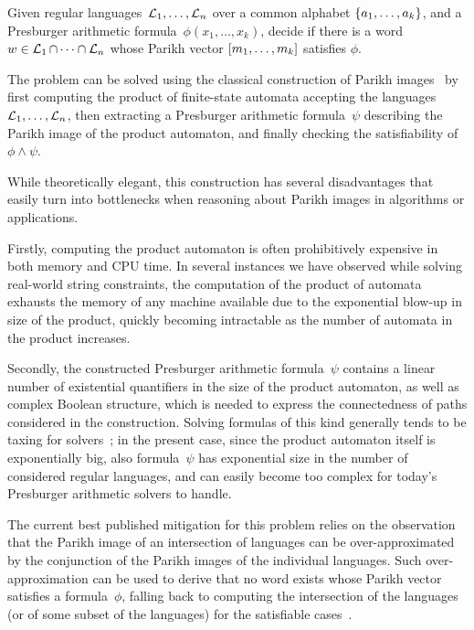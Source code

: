 {
    \centering
    \begin{tcolorbox}[colback=gray!5!white,colframe=gray!75!black,%
        title=Joint satisfiability of Parikh images modulo Presburger arithmetic constraints,%
        width=0.9\linewidth]
        Given regular languages~$\operatorname{\mathcal{L}}_1, \ldots, \operatorname{\mathcal{L}}_n$
        over a common alphabet $\left\{a_1, \ldots, a_k\right\}$,
        and a Presburger arithmetic formula~$\phi(x_1, \ldots, x_k)$, 
        decide if there is a word~$w \in \operatorname{\mathcal{L}}_1 \cap
        \cdots \cap \operatorname{\mathcal{L}}_n$ whose Parikh vector 
        $\left[{m_1, \ldots, m_k}\right]$ satisfies $\phi$.
    \end{tcolorbox}
}

The problem can be solved using the classical construction of Parikh
images~\cite{muscholl-linear,generate-parikh-image} by first computing
the product of finite-state automata accepting the
languages~$\operatorname{\mathcal{L}}_1, \ldots, \operatorname{\mathcal{L}}_n$, then extracting a
Presburger arithmetic formula~$\psi$ describing the Parikh image of the product
automaton, and finally checking the satisfiability of $\phi \wedge \psi$.
  
While theoretically elegant, this construction has several
disadvantages that easily turn into bottlenecks when reasoning about
Parikh images in algorithms or applications.

Firstly, computing the product automaton is often prohibitively
expensive in both memory and CPU time.  In several instances we have
observed while solving real-world string constraints, the computation
of the product of automata exhausts the memory of any machine
available due to the exponential blow-up in size of the product,
quickly becoming intractable as the number of automata in the product
increases.

Secondly, the constructed Presburger arithmetic formula~$\psi$ contains a linear
number of existential quantifiers in the size of the product
automaton, as well as complex Boolean structure, which is needed to
express the connectedness of paths considered in the construction.
Solving formulas of this kind generally tends to be taxing for
solvers~\cite{ostrich-plus}; in the present case, since the product
automaton itself is exponentially big, also formula~$\psi$ has
exponential size in the number of considered regular languages, and
can easily become too complex for today's Presburger arithmetic
solvers to handle.
  
The current best published mitigation for this problem relies on the
observation that the Parikh image of an intersection of languages can
be over-approximated by the conjunction of the Parikh images of the
individual languages. Such over-approximation can be used to derive
that no word exists whose Parikh vector satisfies a formula~$\phi$,
falling back to computing the intersection of the languages (or of
some subset of the languages) for the satisfiable
cases~\cite{approximate-parikh}.

